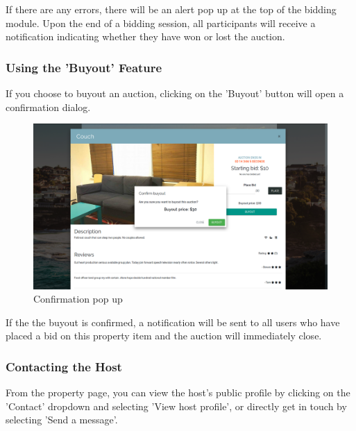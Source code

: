 If there are any errors, there will be an alert pop up at the top of the
bidding module. Upon the end of a bidding session, all participants will receive
a notification indicating whether they have won or lost the auction.

\subsubsection{Using the 'Buyout' Feature}
If you choose to buyout an auction, clicking on the 'Buyout' button will open
a confirmation dialog. 

\begin{figure}[!h]
  \includegraphics[width=\linewidth]{assets/userManual/buyoutConfirm.png}
  \caption{Confirmation pop up}
  \label{fig:buyoutConfirm}
\end{figure}

If the the buyout is confirmed, a notification will be
sent to all users who have placed a bid on this property item and the auction
will immediately close.

\subsubsection{Contacting the Host}
From the property page, you can view the host's public profile by clicking on
the 'Contact' dropdown and selecting 'View host profile', or directly get in
touch by selecting 'Send a message'.

